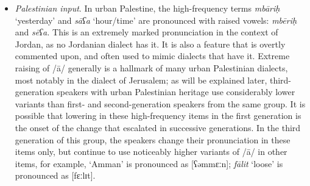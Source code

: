 \documentclass[output=paper]{langsci/langscibook}
\begin{document}
\begin{itemize}
\item[] \textit{Palestinian input}. In urban Palestine, the high-frequency terms \textit{mbāriḥ} `yesterday’ and \textit{sāʕa} ‘hour/time’ are pronounced with raised vowels: \textit{mbēriḥ} and \textit{sēʕa.} This is an extremely marked pronunciation in the context of Jordan, as no Jordanian dialect has it. It is also a feature that is overtly commented upon, and often used to mimic dialects that have it. Extreme raising of /ā/ generally is a hallmark of many urban Palestinian dialects, most notably in the dialect of Jerusalem; as will be explained later, third-generation speakers with urban Palestinian heritage use considerably lower variants than first- and second-generation speakers from the same group. It is possible that lowering in these high-frequency items in the first generation is the onset of the change that escalated in successive generations. In the third generation of this group, the speakers change their pronunciation in these items only, but continue to use noticeably higher variants of /ā/ in other items, for example, ‘Amman’ is pronounced as [ʕəmmɛːn]; \textit{fālit} ‘loose’ is pronounced as [fɛːlɪt].
\end{itemize}
\end{document}
